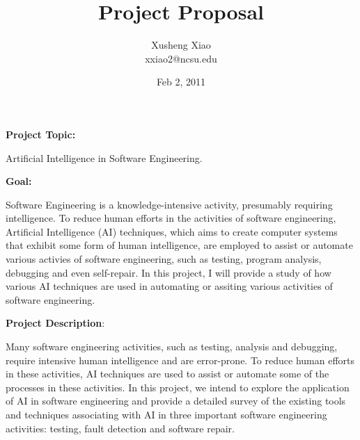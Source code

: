 \documentclass[times, 10pt,onecolumn]{article}
\title{Project Proposal}
\author{
Xusheng Xiao\\
\small{xxiao2@ncsu.edu}\\
}
\date{Feb 2, 2011}
\begin{document}
\maketitle

\begin{flushleft}
\textbf{Project Topic:}\end{flushleft} Artificial Intelligence in Software Engineering.\\

\begin{flushleft}
\textbf{Goal:}\end{flushleft}
Software Engineering is a knowledge-intensive activity, presumably requiring intelligence. To reduce human efforts in the activities of software engineering, Artificial Intelligence (AI) techniques, which aims to create computer systems that exhibit some form of human intelligence, are employed to assist or automate various activies of software engineering, such as testing, program analysis, debugging and even self-repair. In this project, I will provide a study of how various AI techniques are used in automating or assiting various activities of software engineering.
\\

\begin{flushleft}
\textbf{Project Description}:\end{flushleft}
Many software engineering activities, such as testing, analysis and debugging, require intensive human intelligence and are error-prone. To reduce human efforts in these activities, AI techniques are used to assist or automate some of the processes in these activities. In this project, we intend to explore the application of AI in software engineering and provide a detailed survey of the existing tools and techniques associating with AI in three important software engineering activities: testing, fault detection and software repair. 
\end{document}
